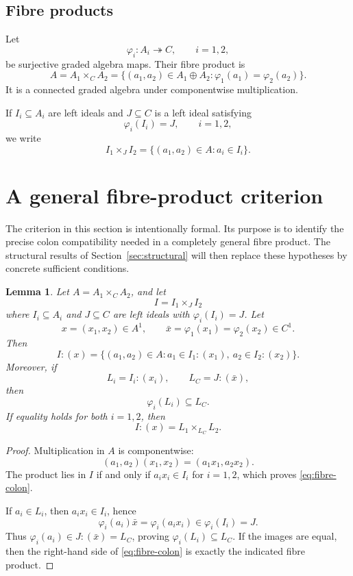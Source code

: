 \documentclass[12pt]{amsart}
\theoremstyle{plain}
\newtheorem{lemma}[theorem]{Lemma}
\theoremstyle{definition}
\theoremstyle{remark}
\numberwithin{equation}{section}
\begin{document}
\subsection{Fibre products}

Let
\[
\varphi_i:A_i\twoheadrightarrow C,\qquad i=1,2,
\]
be surjective graded algebra maps. Their fibre product is
\[
A=A_1\times_C A_2
=
\{(a_1,a_2)\in A_1\oplus A_2:
\varphi_1(a_1)=\varphi_2(a_2)\}.
\]
It is a connected graded algebra under componentwise multiplication.

If \(I_i\subseteq A_i\) are left ideals and \(J\subseteq C\) is a left
ideal satisfying
\[
\varphi_i(I_i)=J,\qquad i=1,2,
\]
we write
\[
I_1\times_J I_2
=
\{(a_1,a_2)\in A:
a_i\in I_i\}.
\]

\section{A general fibre-product criterion}
\label{sec:generalcriterion}

The criterion in this section is intentionally formal. Its purpose
is to identify the precise colon compatibility needed in a completely
general fibre product. The structural results of
Section~\ref{sec:structural} will then replace these hypotheses by
concrete sufficient conditions.

\begin{lemma}
\label{lem:fibre-colon}
Let \(A=A_1\times_C A_2\), and let
\[
I=I_1\times_J I_2
\]
where \(I_i\subseteq A_i\) and \(J\subseteq C\) are left ideals with
\(\varphi_i(I_i)=J\). Let
\[
x=(x_1,x_2)\in A^1,\qquad
\bar x=\varphi_1(x_1)=\varphi_2(x_2)\in C^1.
\]
Then
\begin{equation}\label{eq:fibre-colon}
I:(x)
=
\{(a_1,a_2)\in A:
a_1\in I_1:(x_1),\
a_2\in I_2:(x_2)\}.
\end{equation}
Moreover, if
\[
L_i=I_i:(x_i),
\qquad
L_C=J:(\bar x),
\]
then
\[
\varphi_i(L_i)\subseteq L_C.
\]
If equality holds for both \(i=1,2\), then
\[
I:(x)=L_1\times_{L_C}L_2.
\]
\end{lemma}

\begin{proof}
Multiplication in \(A\) is componentwise:
\[
(a_1,a_2)(x_1,x_2)=(a_1x_1,a_2x_2).
\]
The product lies in \(I\) if and only if
\(a_ix_i\in I_i\) for \(i=1,2\), which proves
\eqref{eq:fibre-colon}.

If \(a_i\in L_i\), then \(a_ix_i\in I_i\), hence
\[
\varphi_i(a_i)\bar x
=
\varphi_i(a_ix_i)
\in
\varphi_i(I_i)
=
J.
\]
Thus \(\varphi_i(a_i)\in J:(\bar x)=L_C\), proving
\(\varphi_i(L_i)\subseteq L_C\). If the images are equal, then the
right-hand side of \eqref{eq:fibre-colon} is exactly the indicated
fibre product.
\end{proof}
\end{document}
